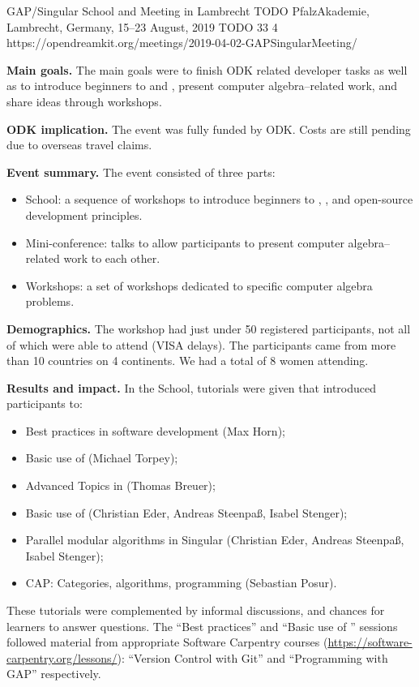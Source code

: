 \begin{event}
  {GAP/Singular School and Meeting in Lambrecht}
  {TODO}  %
  {PfalzAkademie, Lambrecht, Germany, 15--23 August, 2019}
  {TODO}  %
  {33}
  {4}  %
  {https://opendreamkit.org/meetings/2019-04-02-GAPSingularMeeting/}

\textbf{Main goals.}
The main goals were to finish ODK related developer tasks as well as
  to introduce beginners to \GAP and \Singular, present
computer algebra--related work, and share ideas through workshops.

\textbf{ODK implication.}
The event was fully funded by ODK. Costs are still pending due to
overseas travel claims.

\textbf{Event summary.}
The event consisted of three parts:
\begin{itemize}
\item School: a sequence of workshops to introduce beginners to \GAP, \Singular,
  and open-source development principles.
\item Mini-conference: talks to allow participants to present computer
  algebra--related work to each other.
\item Workshops: a set of workshops dedicated to specific computer algebra
  problems.
\end{itemize}

\textbf{Demographics.}
The workshop had just under 50 registered participants, not all of which
  were able to attend (VISA delays).
The participants came from more than 10 countries on 4 continents.
We had a total of 8 women attending.

\textbf{Results and impact.}
In the School, tutorials were given that introduced participants to:
\begin{itemize}
\item Best practices in software development (Max Horn);
\item Basic use of \GAP (Michael Torpey);
\item Advanced Topics in \GAP (Thomas Breuer);
\item Basic use of \Singular (Christian Eder, Andreas Steenpaß, Isabel Stenger);
\item Parallel modular algorithms in Singular (Christian Eder, Andreas Steenpaß, Isabel Stenger);
\item CAP: Categories, algorithms, programming (Sebastian Posur).
\end{itemize}
These tutorials were complemented by informal discussions, and chances for
learners to answer questions.  The ``Best practices'' and ``Basic use of \GAP''
sessions followed material from appropriate Software Carpentry courses
(\url{https://software-carpentry.org/lessons/}): ``Version Control with Git''
and ``Programming with GAP'' respectively.


\end{event}
